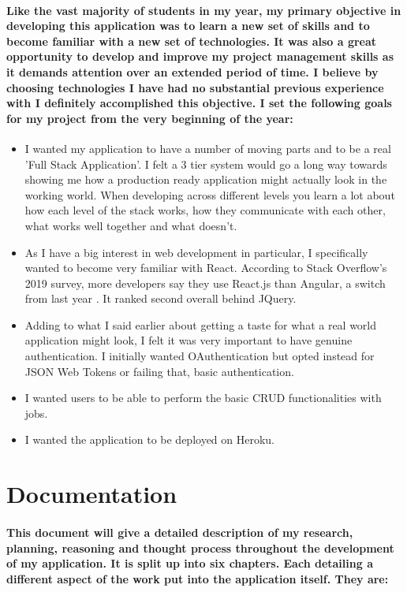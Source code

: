 \paragraph{Like the vast majority of students in my year, my primary objective in developing this application was to learn a new set of skills and to become familiar with a new set of technologies. It was also a great opportunity to develop and improve my project management skills as it demands attention over an extended period of time. I believe by choosing technologies I have had no substantial previous experience with I definitely accomplished this objective. I set the following goals for my project from the very beginning of the year:}
\begin{itemize}
    \item I wanted my application to have a number of moving parts and to be a real 'Full Stack Application'. I felt a 3 tier system would go a long way towards showing me how a production ready application might actually look in the working world. When developing across different levels you learn a lot about how each level of the stack works, how they communicate with each other, what works well together and what doesn't.
    \item As I have a big interest in web development in particular, I specifically wanted to become very familiar with React. According to Stack Overflow's 2019 survey, more developers say they use React.js than Angular, a switch from last year \cite{Stack}. It ranked second overall behind JQuery.
    \item Adding to what I said earlier about getting a taste for what a real world application might look, I felt it was very important to have genuine authentication. I initially wanted OAuthentication but opted instead for JSON Web Tokens or failing that, basic authentication.
    \item I wanted users to be able to perform the basic CRUD functionalities with jobs.
    \item I wanted the application to be deployed on Heroku.

\end{itemize}

\section{Documentation}
\paragraph{This document will give a detailed description of my research, planning, reasoning and thought process throughout the development of my application. It is split up into six chapters. Each detailing a different aspect of the work put into the application itself. They are: }
